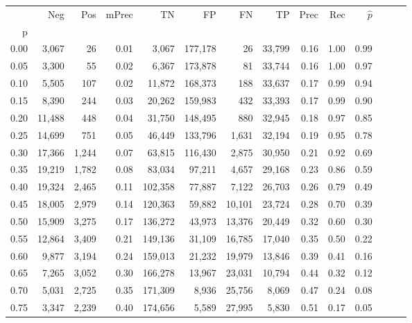\begin{tabular}{rrrrrrrrrrrrrr}
\toprule
{} &     Neg &    Pos & mPrec &       TN &       FP &      FN &      TP &  Prec &   Rec & $\hat{p}$ \\
p    &         &        &       &          &          &         &         &       &       &           \\
\midrule
0.00 &   3,067 &     26 &  0.01 &    3,067 &  177,178 &      26 &  33,799 &  0.16 &  1.00 &      0.99 \\
0.05 &   3,300 &     55 &  0.02 &    6,367 &  173,878 &      81 &  33,744 &  0.16 &  1.00 &      0.97 \\
0.10 &   5,505 &    107 &  0.02 &   11,872 &  168,373 &     188 &  33,637 &  0.17 &  0.99 &      0.94 \\
0.15 &   8,390 &    244 &  0.03 &   20,262 &  159,983 &     432 &  33,393 &  0.17 &  0.99 &      0.90 \\
0.20 &  11,488 &    448 &  0.04 &   31,750 &  148,495 &     880 &  32,945 &  0.18 &  0.97 &      0.85 \\
0.25 &  14,699 &    751 &  0.05 &   46,449 &  133,796 &   1,631 &  32,194 &  0.19 &  0.95 &      0.78 \\
0.30 &  17,366 &  1,244 &  0.07 &   63,815 &  116,430 &   2,875 &  30,950 &  0.21 &  0.92 &      0.69 \\
0.35 &  19,219 &  1,782 &  0.08 &   83,034 &   97,211 &   4,657 &  29,168 &  0.23 &  0.86 &      0.59 \\
0.40 &  19,324 &  2,465 &  0.11 &  102,358 &   77,887 &   7,122 &  26,703 &  0.26 &  0.79 &      0.49 \\
0.45 &  18,005 &  2,979 &  0.14 &  120,363 &   59,882 &  10,101 &  23,724 &  0.28 &  0.70 &      0.39 \\
0.50 &  15,909 &  3,275 &  0.17 &  136,272 &   43,973 &  13,376 &  20,449 &  0.32 &  0.60 &      0.30 \\
0.55 &  12,864 &  3,409 &  0.21 &  149,136 &   31,109 &  16,785 &  17,040 &  0.35 &  0.50 &      0.22 \\
0.60 &   9,877 &  3,194 &  0.24 &  159,013 &   21,232 &  19,979 &  13,846 &  0.39 &  0.41 &      0.16 \\
0.65 &   7,265 &  3,052 &  0.30 &  166,278 &   13,967 &  23,031 &  10,794 &  0.44 &  0.32 &      0.12 \\
0.70 &   5,031 &  2,725 &  0.35 &  171,309 &    8,936 &  25,756 &   8,069 &  0.47 &  0.24 &      0.08 \\
0.75 &   3,347 &  2,239 &  0.40 &  174,656 &    5,589 &  27,995 &   5,830 &  0.51 &  0.17 &      0.05 \\

\end{tabular}
